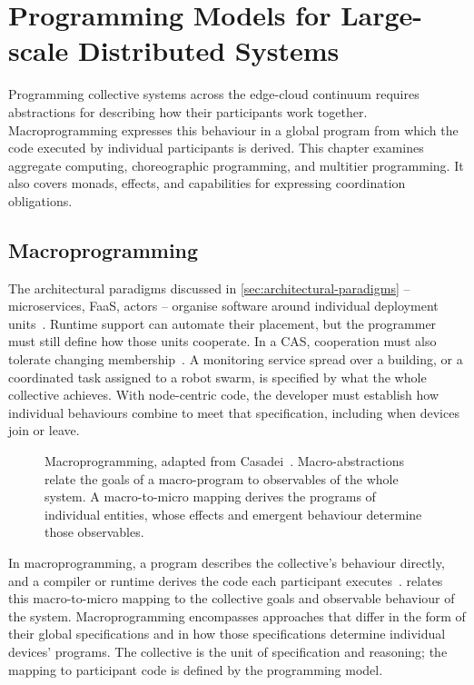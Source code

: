 \chapter{Programming Models for Large-scale Distributed Systems}
\label{chap:programming-models}

Programming collective systems across the edge-cloud continuum requires abstractions for describing how their participants work together.
%
Macroprogramming expresses this behaviour in a global program from which the code executed by individual participants is derived.
%
This chapter examines aggregate computing, choreographic programming, and multitier programming.
%
It also covers monads, effects, and capabilities for expressing coordination obligations.

\section{Macroprogramming}
\label{sec:macro-programming}

The architectural paradigms discussed in \cref{sec:architectural-paradigms} -- microservices, \ac{FaaS}, actors -- organise software around individual deployment units~\cite{DBLP:journals/tse/CrnkovicSVC11}.
Runtime support can automate their placement,
but the programmer must still define how those units cooperate.
%
In a \ac{CAS}, cooperation must also tolerate changing membership~\cite{DBLP:journals/sttt/NicolaJW20}.
%
A monitoring service spread over a building,
or a coordinated task assigned to a robot swarm,
is specified by what the whole collective achieves.
%
With node-centric code,
the developer must establish how individual behaviours combine to meet that specification,
including when devices join or leave.

\begin{figure}[tb]
    \centering
    
    \caption[Macroprogramming and the macro-to-micro mapping]{Macroprogramming, adapted from Casadei~\cite{DBLP:journals/csur/Casadei23}. Macro-abstractions relate the goals of a macro-program to observables of the whole system. A macro-to-micro mapping derives the programs of individual entities, whose effects and emergent behaviour determine those observables.}
    \label{fig:macroprogramming}
\end{figure}

In macroprogramming,
a program describes the collective's behaviour directly,
and a compiler or runtime derives the code each participant executes~\cite{DBLP:journals/csur/Casadei23}.
%
 relates this macro-to-micro mapping to the collective goals and observable behaviour of the system.
%
Macroprogramming encompasses approaches that differ in the form of their global specifications and in how those specifications determine individual devices' programs.
%
The collective is the unit of specification and reasoning;
the mapping to participant code is defined by the programming model.

